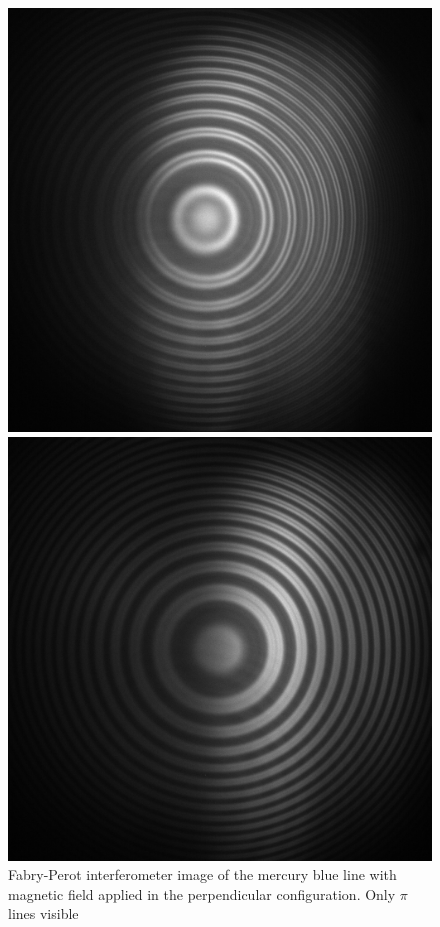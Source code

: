 \documentclass[11pt]{article}
\begin{document}
\begin{figure}[h!]
    \centering
    \begin{minipage}[t]{0.47\linewidth}
        \centering
        \includegraphics[width=\linewidth]{Hg blue pi high zeeman.png}
        \captionsetup{justification=centering}
        \caption{Fabry-Perot interferometer image of the mercury blue line with magnetic field applied in the perpendicular configuration. Only $\pi$ lines visible}
        \label{img: Hg blue pi perp}
    \end{minipage}\hfill
    \begin{minipage}[t]{0.47\linewidth}
        \centering
        \includegraphics[width=\linewidth]{hg blue sigma lines nearly overlapping.png}

\end{minipage}
\end{figure}
\end{document}
